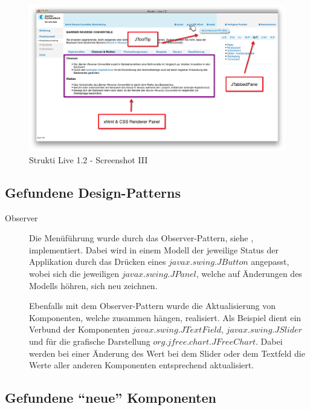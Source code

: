   \begin{figure}[htb]
    \begin{center}
      \includegraphics[width=\textwidth]{./image/SL/SL-03.png}
      \caption{Strukti Live 1.2 - Screenshot III}
      \label{img:SL-03}
    \end{center}
  \end{figure}
  
  \subsection{Gefundene Design-Patterns}
  
  \begin{description}
    \item[Observer]
    Die Menüführung wurde durch das Observer-Pattern, siehe
    \cite{ObserverDesignPattern}, implementiert. Dabei wird in einem Modell
    der jeweilige Status der Applikation durch das Drücken eines
    \(javax.swing.JButton\) angepasst, wobei sich die jeweiligen
    \(javax.swing.JPanel\), welche auf Änderungen des Modells höhren, sich neu
    zeichnen.

    Ebenfalls mit dem Observer-Pattern wurde die Aktualisierung von Komponenten,
    welche zusammen hängen, realisiert. Als Beispiel dient ein Verbund der
    Komponenten \(javax.swing.JTextField\), \(javax.swing.JSlider\) und für die
    grafische Darstellung \(org.jfree.chart.JFreeChart\). Dabei werden bei
    einer Änderung des Wert bei dem Slider oder dem Textfeld die Werte aller
    anderen Komponenten entsprechend aktualisiert.
  \end{description}
  
  \subsection{Gefundene ``neue'' Komponenten}
  
